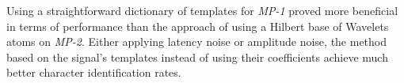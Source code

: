 \documentclass[brainsci,article,accept,moreauthors,pdftex,10pt,a4paper]{mdpi}
\begin{document}




Using a straightforward dictionary of templates for \textit{MP-1} proved more beneficial in terms of performance than the approach of using a Hilbert base of Wavelets atoms on \textit{MP-2}.  Either applying latency noise or amplitude noise, the method based on the signal's templates instead of using their coefficients achieve much better character identification rates.  
\end{document}
